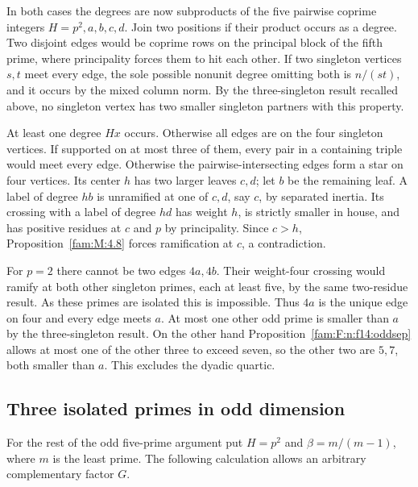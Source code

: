 \documentclass[11pt,a4paper]{article}
\numberwithin{equation}{section}
\theoremstyle{remark}
\begin{document}
In both cases the degrees are now subproducts of the five pairwise coprime integers $H=p^2,a,b,c,d$. Join two positions if their product occurs as a degree. Two disjoint edges would be coprime rows on the principal block of the fifth prime, where principality forces them to hit each other. If two singleton vertices $s,t$ meet every edge, the sole possible nonunit degree omitting both is $n/(st)$, and it occurs by the mixed column norm. By the three-singleton result recalled above, no singleton vertex has two smaller singleton partners with this property.

At least one degree $Hx$ occurs. Otherwise all edges are on the four singleton vertices. If supported on at most three of them, every pair in a containing triple would meet every edge. Otherwise the pairwise-intersecting edges form a star on four vertices. Its center $h$ has two larger leaves $c,d$; let $b$ be the remaining leaf. A label of degree $hb$ is unramified at one of $c,d$, say $c$, by separated inertia. Its crossing with a label of degree $hd$ has weight $h$, is strictly smaller in house, and has positive residues at $c$ and $p$ by principality. Since $c>h$, Proposition~\ref{fam:M:4.8} forces ramification at $c$, a contradiction.

For $p=2$ there cannot be two edges $4a,4b$. Their weight-four crossing would ramify at both other singleton primes, each at least five, by the same two-residue result. As these primes are isolated this is impossible. Thus $4a$ is the unique edge on four and every edge meets $a$. At most one other odd prime is smaller than $a$ by the three-singleton result. On the other hand Proposition~\ref{fam:F:n:f14:oddsep} allows at most one of the other three to exceed seven, so the other two are $5,7$, both smaller than $a$. This excludes the dyadic quartic.
\subsection{Three isolated primes in odd dimension}\label{fam:C:sec:2}
For the rest of the odd five-prime argument put $H=p^2$ and $\beta=m/(m-1)$, where $m$ is the least prime. The following calculation allows an arbitrary complementary factor $G$.
\end{document}
